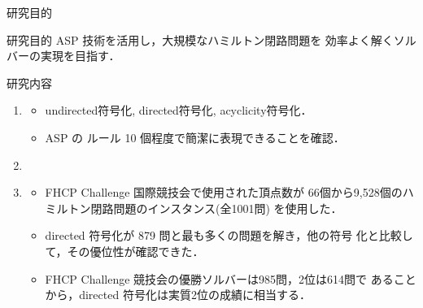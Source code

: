 \documentclass[dvipdfmx,10pt]{beamer}
\begin{document}
\begin{frame}{研究目的}
  \begin{alertblock}{研究目的}
  ASP 技術を活用し，大規模なハミルトン閉路問題を
    効率よく解くソルバーの実現を目指す．
  \end{alertblock}
  \begin{block}{研究内容}
    \begin{enumerate}
    \item {}
      \begin{itemize}
      \item \textsf{undirected}符号化, \textsf{directed}符号化, \textsf{acyclicity}符号化．
      \item ASP の \alert{ルール 10 個程度で簡潔に表現}できることを確認．
      \end{itemize}
    \item {}
    \item {}
      \begin{itemize}
        \item \alert{FHCP Challenge 国際競技会}で使用された頂点数が
          66個から9,528個のハミルトン閉路問題のインスタンス(全1001問)
          を使用した．
        \item directed 符号化が 879 問と最も多くの問題を解き，他の符号
          化と比較して，その優位性が確認できた．
        \item FHCP Challenge 競技会の優勝ソルバーは985問，2位は614問で
          あることから，directed 符号化は\alert{実質2位}の成績に相当する．
        \end{itemize}
    \end{enumerate}
  \end{block}
\end{frame}
\end{document}
